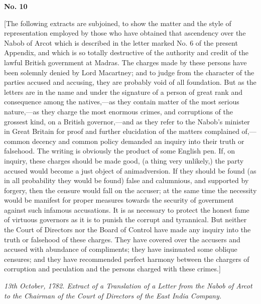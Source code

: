 \PRLsep
\begin{center}
  \textbf{\large No. 10} \par 
\end{center}
\vspace{0.3cm}



[The following extracts are subjoined, to show the matter and the style of representation employed by those who have obtained that ascendency over the Nabob of Arcot which is described in the letter marked No. 6 of the present Appendix, and which is so totally destructive of the authority and credit of the lawful British government at Madras. The charges made by these persons have been solemnly denied by Lord Macartney; and to judge from the character of the parties accused and accusing, they are probably void of all foundation. But as the letters are in the name and under the signature of a person of great rank and consequence among the natives,—as they contain matter of the most serious nature,—as they charge the most enormous crimes, and corruptions of the grossest kind, on a British governor,—and as they refer to the Nabob's minister in Great Britain for proof and further elucidation of the matters complained of,—common decency and common policy demanded an inquiry into their truth or falsehood. The writing is obviously the product of some English pen. If, on inquiry, these charges should be made good, (a thing very unlikely,) the party accused would become a just object of animadversion. If they should be found (as in all probability they would be found) false and calumnious, and supported by forgery, then the censure would fall on the accuser; at the same time the necessity would be manifest for proper measures towards the security of government against such infamous accusations. It is as necessary to protect the honest fame of virtuous governors as it is to punish the corrupt and tyrannical. But neither the Court of Directors nor the Board of Control have made any inquiry into the truth or falsehood of these charges. They have covered over the accusers and accused with abundance of compliments; they have insinuated some oblique censures; and they have recommended perfect harmony between the chargers of corruption and peculation and the persons charged with these crimes.]

\vspace{0.3cm}
\textit{13th October, 1782. Extract of a Translation of a Letter from the Nabob of Arcot to the Chairman of the Court of Directors of the East India Company.}
\vspace{0.3cm}

